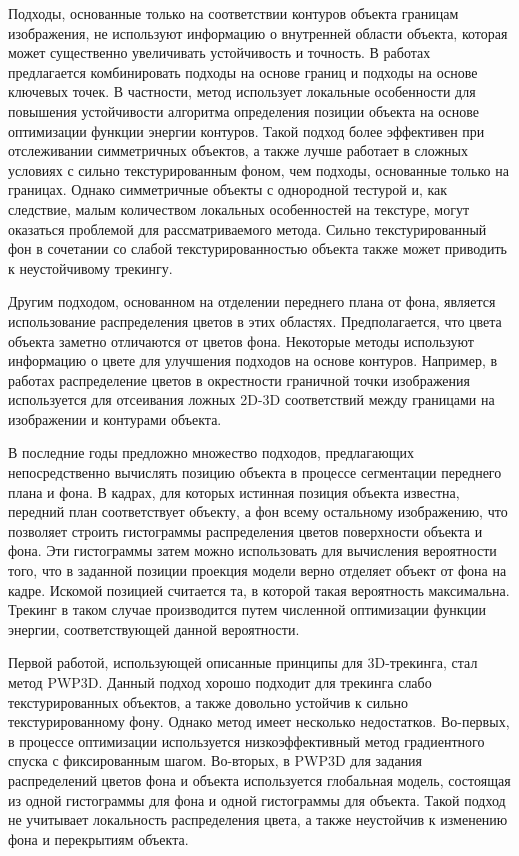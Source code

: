 Подходы, основанные только на соответствии контуров объекта границам
изображения, не используют информацию о внутренней области объекта, которая
может существенно увеличивать устойчивость и точность.
В работах \cite{VacchettiEdges2004,ChoiFeaturesAndEdges,Bugaev_2018_ECCV}
предлагается комбинировать подходы на основе границ и подходы на основе
ключевых точек.
В частности, метод \cite{Bugaev_2018_ECCV} использует локальные особенности для
повышения устойчивости алгоритма определения позиции объекта на основе
оптимизации функции энергии контуров.
Такой подход более эффективен при отслеживании симметричных объектов, а также
лучше работает в сложных условиях с сильно текстурированным фоном, чем подходы,
основанные только на границах.
Однако симметричные объекты с однородной тестурой и, как следствие, малым
количеством локальных особенностей на текстуре, могут оказаться проблемой для
рассматриваемого метода.
Сильно текстурированный фон в сочетании со слабой текстурированностью
объекта также может приводить к неустойчивому трекингу.

Другим подходом, основанном на отделении переднего плана от фона, является
использование распределения цветов в этих областях.
Предполагается, что цвета объекта заметно отличаются от цветов фона.
Некоторые методы \cite{SeoHinterstoisser2014,WangZhong2015,Zhong2018}
используют информацию о цвете для улучшения подходов на основе контуров.
Например, в работах \cite{SeoHinterstoisser2014,WangZhong2015} распределение
цветов в окрестности граничной точки изображения используется для отсеивания
ложных 2D-3D соответствий между границами на изображении и контурами объекта.

В последние годы предложно множество подходов, предлагающих непосредственно
вычислять позицию объекта в процессе сегментации переднего плана и фона.
В кадрах, для которых истинная позиция объекта известна, передний план
соответствует объекту, а фон всему остальному изображению, что позволяет
строить гистограммы распределения цветов поверхности объекта и фона.
Эти гистограммы затем можно использовать для вычисления вероятности того, что в
заданной позиции проекция модели верно отделяет объект от фона на кадре.
Искомой позицией считается та, в которой такая вероятность максимальна.
Трекинг в таком случае производится путем численной оптимизации функции
энергии, соответствующей данной вероятности.

Первой работой, использующей описанные принципы для 3D-трекинга, стал метод
PWP3D\cite{PWP3D}.
Данный подход хорошо подходит для трекинга слабо текстурированных объектов, а
также довольно устойчив к сильно текстурированному фону.
Однако метод \cite{PWP3D} имеет несколько недостатков.
Во-первых, в процессе оптимизации используется низкоэффективный метод
градиентного спуска с фиксированным шагом.
Во-вторых, в PWP3D для задания распределений цветов фона и объекта используется
глобальная модель, состоящая из одной гистограммы для фона и одной гистограммы
для объекта.
Такой подход не учитывает локальность распределения цвета, а также неустойчив к
изменению фона и перекрытиям объекта.

